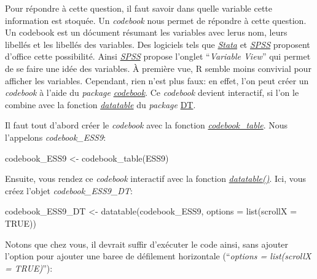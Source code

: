 \documentclass[
]{book}
\newenvironment{Shaded}{\begin{snugshade}}{\end{snugshade}}
\newcommand{\AttributeTok}[1]{\textcolor[rgb]{0.77,0.63,0.00}{#1}}
\newcommand{\ConstantTok}[1]{\textcolor[rgb]{0.00,0.00,0.00}{#1}}
\newcommand{\FunctionTok}[1]{\textcolor[rgb]{0.00,0.00,0.00}{#1}}
\newcommand{\NormalTok}[1]{#1}
\newcommand{\OtherTok}[1]{\textcolor[rgb]{0.56,0.35,0.01}{#1}}
\begin{document}
Pour répondre à cette question, il faut savoir dans quelle variable cette information est stoquée. Un \emph{codebook} nous permet de répondre à cette question. Un codebook est un dócument résumant les variables avec lerus nom, leurs libellés et les libellés des variables. Des logiciels tels que \href{https://www.stata.com/}{\emph{Stata}} et \href{https://www.ibm.com/fr-fr/products/spss-statistics}{\emph{SPSS}} proposent d'office cette possibilité. Ainsi \href{https://www.ibm.com/fr-fr/products/spss-statistics}{\emph{SPSS}} propose l'onglet ``\emph{Variable View}'' qui permet de se faire une idée des variables. À première vue, R semble moins convivial pour afficher les variables. Cependant, rien n'est plus faux: en effet, l'on peut créer un \emph{codebook} à l'aide du \emph{package} \href{https://rubenarslan.github.io/codebook/index.html}{\emph{codebook}}. Ce \emph{codebook} devient interactif, si l'on le combine avec la fonction \href{https://www.rdocumentation.org/packages/DT/versions/0.26/topics/datatable}{\emph{datatable}} du \emph{package} \href{https://rstudio.github.io/DT/}{DT}.

Il faut tout d'abord créer le \emph{codebook} avec la fonction \href{https://www.rdocumentation.org/packages/codebook/versions/0.9.2/topics/codebook_table}{\emph{codebook\_table}}. Nous l'appelons \emph{codebook\_ESS9}:

\begin{Shaded}
\begin{Highlighting}[]
\NormalTok{codebook\_ESS9 }\OtherTok{\textless{}{-}} \FunctionTok{codebook\_table}\NormalTok{(ESS9)}
\end{Highlighting}
\end{Shaded}

Ensuite, vous rendez ce \emph{codebook} interactif avec la fonction \href{https://www.rdocumentation.org/packages/DT/versions/0.26/topics/datatable}{\emph{datatable()}}. Ici, vous créez l'objet \emph{codebook\_ESS9\_DT}:

\begin{Shaded}
\begin{Highlighting}[]
\NormalTok{codebook\_ESS9\_DT }\OtherTok{\textless{}{-}} \FunctionTok{datatable}\NormalTok{(codebook\_ESS9, }\AttributeTok{options =} \FunctionTok{list}\NormalTok{(}\AttributeTok{scrollX =} \ConstantTok{TRUE}\NormalTok{))}
\end{Highlighting}
\end{Shaded}

Notons que chez vous, il devrait suffir d'exécuter le code ainsi, sans ajouter l'option pour ajouter une baree de défilement horizontale (``\emph{options = list(scrollX = TRUE)}''):
\end{document}
